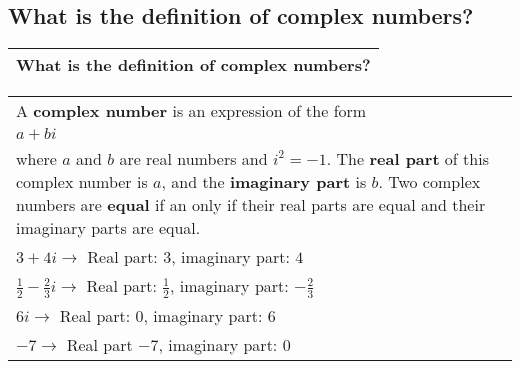 \subsection{What is the definition of complex numbers?}
\begin{small}
    \begin{tabularx}{1\textwidth}{
            p{}
        }
        \toprule
            What is the definition of complex numbers?
        \\
        \bottomrule
    \end{tabularx}
\end{small}
\begin{small}
    \begin{tabularx}{1\textwidth}{
            p{}
        }
        \toprule
        A \textbf{complex number} is an expression of the form \\
        $ a + bi $ \\
        where $a$ and $b$ are real numbers and $i^2 = -1$. The \textbf{real part} of this complex
        number is $a$, and the \textbf{imaginary part} is $b$. Two complex
        numbers are \textbf{equal} if an only if their real parts are equal and
        their imaginary parts are equal.
        \\
        \midrule
        $3+4i \rightarrow $ Real part: $3$, imaginary part: $4$\\
        $\frac{1}{2} - \frac{2}{3}i \rightarrow $ Real part: $\frac{1}{2}$, imaginary part: $-\frac{2}{3}$\\
        $6i \rightarrow $ Real part: $0$, imaginary part: $6$\\
        $-7 \rightarrow$ Real part $-7$, imaginary part: $0$\\
        \bottomrule

    \end{tabularx}
\end{small}
